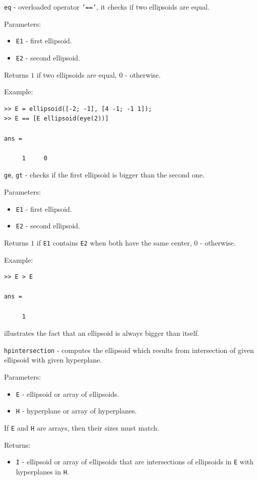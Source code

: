 \documentclass{report}
\begin{document}
\newpage

{\Large {\tt eq}} - overloaded operator {\tt '=='},
it checks if two ellipsoids are equal.

Parameters:
\begin{itemize}
\item {\tt E1} - first ellipsoid.
\item {\tt E2} - second ellipsoid.
\end{itemize}

Returns $1$ if two ellipsoids are equal, $0$ - otherwise.

Example:
{\tt \begin{verbatim}
>> E = ellipsoid([-2; -1], [4 -1; -1 1]);
>> E == [E ellipsoid(eye(2))]

ans =

     1     0
\end{verbatim} }

\newpage

{\Large {\tt ge}}, {\Large {\tt gt}} - checks if the first ellipsoid is bigger
than the second one.

Parameters:
\begin{itemize}
\item {\tt E1} - first ellipsoid.
\item {\tt E2} - second ellipsoid.
\end{itemize}

Returns $1$ if {\tt E1} contains {\tt E2} when both have the same center,
$0$ - otherwise.

Example:
{\tt \begin{verbatim}
>> E > E

ans =

     1
\end{verbatim} }
illustrates the fact that an ellipsoid is always bigger than itself.

\newpage

{\Large {\tt hpintersection}} - computes the ellipsoid which results from
intersection of given ellipsoid with given hyperplane.

Parameters:
\begin{itemize}
\item {\tt E} - ellipsoid or array of ellipsoids.
\item {\tt H} - hyperplane or array of hyperplanes.
\end{itemize}
If {\tt E} and {\tt H} are arrays, then their sizes must match.

Returns:
\begin{itemize}
\item {\tt I} - ellipsoid or array of ellipsoids that are intersections of
ellipsoids in {\tt E} with hyperplanes in {\tt H}.
\end{itemize}
\end{document}
